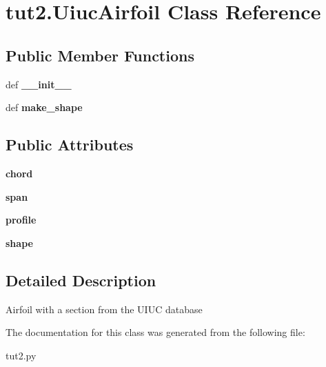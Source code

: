\hypertarget{classtut2_1_1UiucAirfoil}{\section{tut2.\-Uiuc\-Airfoil \-Class \-Reference}
\label{classtut2_1_1UiucAirfoil}
}
\subsection*{\-Public \-Member \-Functions}
\begin{DoxyCompactItemize}
\item 
\hypertarget{classtut2_1_1UiucAirfoil_a55ae28e1e8de471bc5e6d097b98e46a1}{def {\bfseries \-\_\-\-\_\-init\-\_\-\-\_\-}}\label{classtut2_1_1UiucAirfoil_a55ae28e1e8de471bc5e6d097b98e46a1}

\item 
\hypertarget{classtut2_1_1UiucAirfoil_a2eb716cffc4f755ccdd15fce81a0e5c3}{def {\bfseries make\-\_\-shape}}\label{classtut2_1_1UiucAirfoil_a2eb716cffc4f755ccdd15fce81a0e5c3}

\end{DoxyCompactItemize}
\subsection*{\-Public \-Attributes}
\begin{DoxyCompactItemize}
\item 
\hypertarget{classtut2_1_1UiucAirfoil_a711bf8153dad7a906d8af6cb6056305e}{{\bfseries chord}}\label{classtut2_1_1UiucAirfoil_a711bf8153dad7a906d8af6cb6056305e}

\item 
\hypertarget{classtut2_1_1UiucAirfoil_aea8f2f14b55d6197a90d1661800023b6}{{\bfseries span}}\label{classtut2_1_1UiucAirfoil_aea8f2f14b55d6197a90d1661800023b6}

\item 
\hypertarget{classtut2_1_1UiucAirfoil_a6b2f576d9f4ba29c59e728cb7848fbb0}{{\bfseries profile}}\label{classtut2_1_1UiucAirfoil_a6b2f576d9f4ba29c59e728cb7848fbb0}

\item 
\hypertarget{classtut2_1_1UiucAirfoil_a1df98a00dafb28e00a5376ebb176e001}{{\bfseries shape}}\label{classtut2_1_1UiucAirfoil_a1df98a00dafb28e00a5376ebb176e001}

\end{DoxyCompactItemize}


\subsection{\-Detailed \-Description}
\begin{DoxyVerb}
Airfoil with a section from the UIUC database
\end{DoxyVerb}
 

\-The documentation for this class was generated from the following file\-:\begin{DoxyCompactItemize}
\item 
tut2.\-py\end{DoxyCompactItemize}

